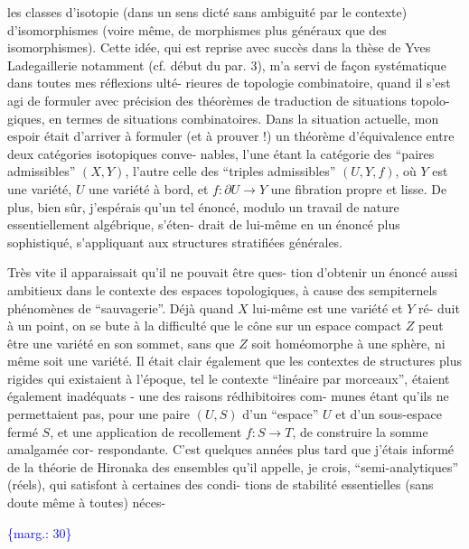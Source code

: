 \documentclass[11pt]{article}
\newcommand{\scanpage}[1]{\par\bigskip\noindent{\small\sffamily[scan #1]}\par}
\newcommand{\mspage}[1]{{\small\sffamily[p.\,#1]}}
\newcommand{\margin}[1]{\textcolor{blue}{\{\textsf{marg.:} #1\}}}
\begin{document}
les classes d'isotopie (dans un sens dicté sans ambiguité par le
contexte) d'isomorphismes (voire même, de morphismes plus généraux
que des isomorphismes). Cette idée, qui est reprise avec succès
dans la thèse de Yves Ladegaillerie notamment (cf. début du par. 3),
m'a servi de façon systématique dans toutes mes réflexions ulté-%
rieures de topologie combinatoire, quand il s'est agi de formuler
avec précision des théorèmes de traduction de situations topolo-%
giques, en termes de situations combinatoires. Dans la situation
actuelle, mon espoir était d'arriver à formuler (et à prouver !)
un théorème d'équivalence entre deux catégories isotopiques conve-%
nables, l'une étant la catégorie des ``paires admissibles'' $(X,Y)$,
l'autre celle des ``triples admissibles'' $(U,Y,f)$, où $Y$ est une
variété, $U$ une variété à bord, et $f : \partial U \longrightarrow Y$ une fibration
propre et lisse. De plus, bien sûr, j'espérais qu'un tel énoncé,
modulo un travail de nature essentiellement algébrique, s'éten-%
drait de lui-même en un énoncé plus sophistiqué, s'appliquant aux
structures stratifiées générales.

Très vite il apparaissait qu'il ne pouvait être ques-%
tion d'obtenir un énoncé aussi ambitieux dans le contexte des
espaces topologiques, à cause des sempiternels phénomènes de
``sauvagerie''. Déjà quand $X$ lui-même est une variété et $Y$ ré-%
duit à un point, on se bute à la difficulté que le cône sur un
espace compact $Z$ peut être une variété en son sommet, sans que
$Z$ soit homéomorphe à une sphère, ni même soit une variété. Il
était clair également que les contextes de structures plus rigides
qui existaient à l'époque, tel le contexte ``linéaire par morceaux'',
étaient également inadéquats - une des raisons rédhibitoires com-%
munes étant qu'ils ne permettaient pas, pour une paire $(U,S)$
d'un ``espace'' $U$ et d'un sous-espace fermé $S$, et une application
de recollement $f : S \longrightarrow T$, de construire la somme amalgamée cor-%
respondante. C'est quelques années plus tard que j'étais informé
de la théorie de Hironaka des ensembles qu'il appelle, je crois,
``semi-analytiques'' (réels), qui satisfont à certaines des condi-%
tions de stabilité essentielles (sans doute même à toutes) néces-

\margin{30}

\clearpage
\scanpage{119/31}
\mspage{29}
\end{document}
